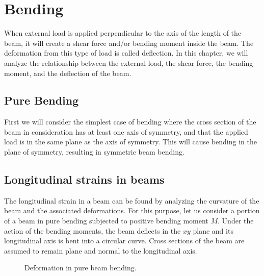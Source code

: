 \documentclass[a4paper,openany,12pt]{book}
\begin{document}
\section{Bending}
\label{section: bending}
When external load is applied perpendicular to the axis of the length of
the beam, it will create a shear force and/or bending moment inside the
beam. The deformation from this type of load is called deflection. In
this chapter, we will analyze the relationship between the external
load, the shear force, the bending moment, and the deflection of the
beam.

\subsection{Pure Bending}
\label{pure-bending}
First we will consider the simplest case of bending where the cross
section of the beam in consideration has at least one axis of symmetry,
and that the applied load is in the same plane as the axis of symmetry.
This will cause bending in the plane of symmetry, resulting in symmetric
beam bending.

\subsection{Longitudinal strains in beams}
\label{longitudinal-strains-in-beams}
The longitudinal strain in a beam can be found by analyzing the
curvature of the beam and the associated deformations. For this purpose,
let us consider a portion of a beam in pure bending subjected to
positive bending moment \(M\). Under the action of the bending moments,
the beam deflects in the \(xy\) plane and its longitudinal axis is bent
into a circular curve. Cross sections of the beam are assumed to remain
plane and normal to the longitudinal axis.

\begin{figure}[h]
  \centering
  \caption{Deformation in pure beam bending.}
\end{figure}
\end{document}
